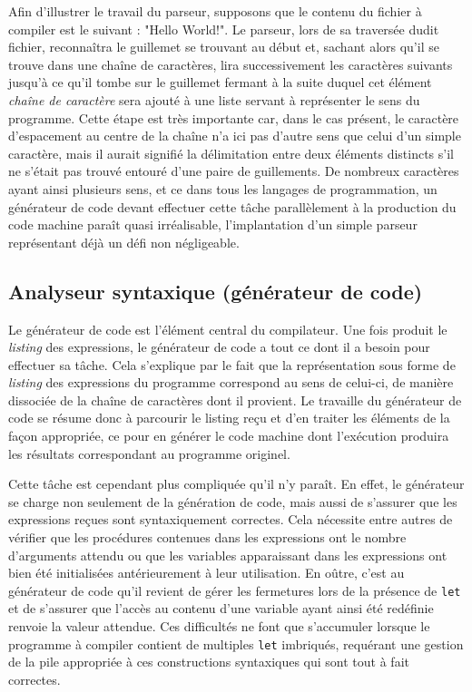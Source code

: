 \documentclass[12pt]{article}
\begin{document}
Afin d'illustrer le travail du parseur, supposons que le contenu du fichier à compiler est le suivant : "Hello World!". Le parseur, lors de sa traversée dudit fichier, reconnaîtra le guillemet se trouvant au début et, sachant alors qu'il se trouve dans une chaîne de caractères, lira successivement les caractères suivants jusqu'à ce qu'il tombe sur le guillemet fermant à la suite duquel cet élément \textit{chaîne de caractère} sera ajouté à une liste servant à représenter le sens du programme. Cette étape est très importante car, dans le cas présent, le caractère d'espacement au centre de la chaîne n'a ici pas d'autre sens que celui d'un simple caractère, mais il aurait signifié la délimitation entre deux éléments distincts s'il ne s'était pas trouvé entouré d'une paire de guillements. De nombreux caractères ayant ainsi plusieurs sens, et ce dans tous les langages de programmation, un générateur de code devant effectuer cette tâche parallèlement à la production du code machine paraît quasi irréalisable, l'implantation d'un simple parseur représentant déjà un défi non négligeable.

\subsection{Analyseur syntaxique (générateur de code)}
Le générateur de code est l'élément central du compilateur. Une fois produit le \textit{listing} des expressions, le générateur de code a tout ce dont il a besoin pour effectuer sa tâche. Cela s'explique par le fait que la représentation sous forme de \textit{listing} des expressions du programme correspond au sens de celui-ci, de manière dissociée de la chaîne de caractères dont il provient. Le travaille du générateur de code se résume donc à parcourir le listing reçu et d'en traiter les éléments de la façon appropriée, ce pour en générer le code machine dont l'exécution produira les résultats correspondant au programme originel.

Cette tâche est cependant plus compliquée qu'il n'y paraît. En effet, le générateur se charge non seulement de la génération de code, mais aussi de s'assurer que les expressions reçues sont syntaxiquement correctes. Cela nécessite entre autres de vérifier que les procédures contenues dans les expressions ont le nombre d'arguments attendu ou que les variables apparaissant dans les expressions ont bien été initialisées antérieurement à leur utilisation. En oûtre, c'est au générateur de code qu'il revient de gérer les fermetures lors de la présence de \texttt{let} et de s'assurer que l'accès au contenu d'une variable ayant ainsi été redéfinie renvoie la valeur attendue. Ces difficultés ne font que s'accumuler lorsque le programme à compiler contient de multiples \texttt{let} imbriqués, requérant une gestion de la pile appropriée à ces constructions syntaxiques qui sont tout à fait correctes.
\end{document}
